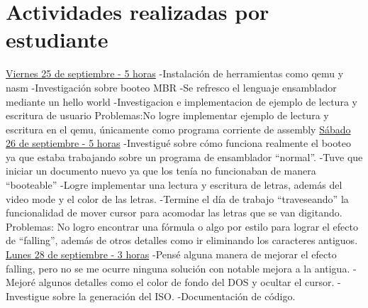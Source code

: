 \documentclass{report}
\begin{document}
\section{Actividades realizadas por estudiante}
\newline
{\underline {Viernes 25 de septiembre - 5 horas}
\newline
-Instalación de herramientas como qemu y nasm \newline
-Investigación sobre booteo MBR\newline
-Se refresco el lenguaje ensamblador mediante un hello world\newline
-Investigacion e implementacion de ejemplo de lectura y escritura de usuario\newline
\newline
Problemas:No logre implementar ejemplo de lectura y escritura en el qemu, únicamente como programa corriente de assembly
\newline
\newline
{\underline {Sábado 26 de septiembre - 5 horas}}
\newline
-Investigué sobre cómo funciona realmente el booteo ya que estaba trabajando sobre un programa de ensamblador “normal”. \newline
-Tuve que iniciar un documento nuevo ya que los tenía no funcionaban de manera “booteable”\newline
-Logre implementar una lectura y escritura de letras, además del video mode y el color de las letras.\newline
-Termine el día de trabajo “traveseando” la funcionalidad de mover cursor para acomodar las letras que se van digitando.\newline
\newline
Problemas:
No logro encontrar una fórmula o algo por estilo para lograr el efecto de “falling”, además de otros detalles como ir eliminando los caracteres antiguos.
\newline
\newline
{\underline {Lunes 28 de septiembre - 3 horas}
\newline
-Pensé alguna manera de mejorar el efecto falling, pero no se me ocurre ninguna solución con notable mejora a la antigua. \newline
-Mejoré algunos detalles como el color de fondo del DOS y ocultar el cursor.\newline
-Investigue sobre la generación del ISO.\newline
-Documentación de código.\newline
}}
\end{document}
